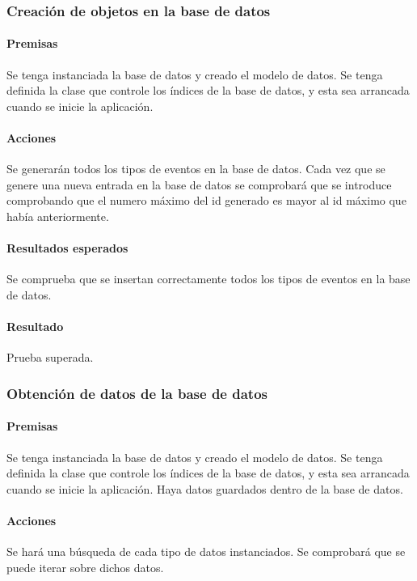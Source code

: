 \subsubsection{Creación de objetos en la base de datos}

\paragraph{Premisas}
Se tenga instanciada la base de datos y creado el modelo de datos.
Se tenga definida la clase que controle los índices de la base de datos, y esta sea arrancada cuando se inicie la aplicación.

\paragraph{Acciones}
Se generarán todos los tipos de eventos en la base de datos.
Cada vez que se genere una nueva entrada en la base de datos se comprobará que se introduce comprobando que el numero máximo del id generado es mayor al id máximo que había anteriormente.

\paragraph{Resultados esperados}

Se comprueba que se insertan correctamente todos los tipos de eventos en la base de datos.

\paragraph{Resultado}
Prueba superada.

\subsubsection{Obtención de datos de la base de datos}

\paragraph{Premisas}
Se tenga instanciada la base de datos y creado el modelo de datos.
Se tenga definida la clase que controle los índices de la base de datos, y esta sea arrancada cuando se inicie la aplicación.
Haya datos guardados dentro de la base de datos.

\paragraph{Acciones}
Se hará una búsqueda de cada tipo de datos instanciados.
Se comprobará que se puede iterar sobre dichos datos.

